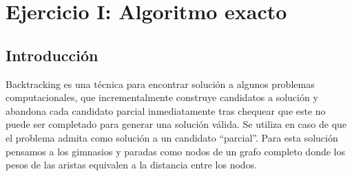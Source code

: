 \section{Ejercicio I: Algoritmo exacto}

\subsection{Introducci\'on}

Backtracking es una técnica para encontrar solución a algunos problemas computacionales, que incrementalmente construye candidatos a solución y abandona cada candidato parcial inmediatamente tras chequear que este no puede ser completado para generar una solución válida. Se utiliza en caso de que el problema admita como solución a un candidato ``parcial''.
Para esta solución pensamos a los gimnasios y paradas como nodos de un grafo completo donde los pesos de las aristas equivalen a la distancia entre los nodos.


